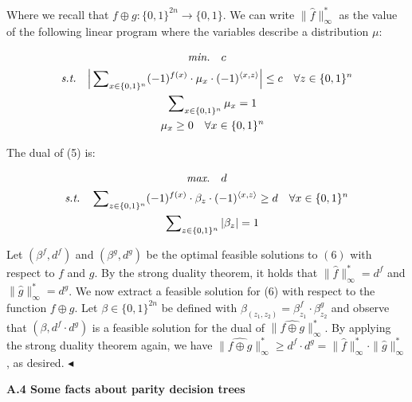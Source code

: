 Where we recall that $f\oplus g:\{0,1\}^{2n}\to\{0,1\}$. We can write $\|\widehat{f}\|_{\infty}^{*}$ as the value of the following linear program where the variables describe a distribution $\mu$:\par


\[\begin{gathered}
\emph{min.} \displaystyle\quad c \\
\emph{s.t.} \displaystyle\quad\Big{|}\sum\nolimits_{x\in\{0,1\}^{n}}(-1)^{f(x)}\cdot\mu_{x}\cdot(-1)^{\langle x,z\rangle}\Big{|}\leq c \displaystyle\quad\forall z\in\{0,1\}^{n} \\
\displaystyle\quad\sum\nolimits_{x\in\{0,1\}^{n}}\mu_{x}=1 \\
\displaystyle\quad\mu_{x}\geq 0 \displaystyle\quad\forall x\in\{0,1\}^{n}
\end{gathered}\]


The dual of (5) is:\par


\[\begin{gathered}
\emph{max.} \displaystyle\quad d \\
\emph{s.t.} \displaystyle\quad\sum\nolimits_{z\in\{0,1\}^{n}}(-1)^{f(x)}\cdot\beta_{z}\cdot(-1)^{\langle x,z\rangle}\geq d\quad\forall x\in\{0,1\}^{n} \\
\displaystyle\quad\sum\nolimits_{z\in\{0,1\}^{n}}|\beta_{z}|=1
\end{gathered}\]


Let $(\beta^{f},d^{f})$ and $(\beta^{g},d^{g})$ be the optimal feasible solutions to $(6)$ with respect to $f$ and $g$. By the strong duality theorem, it holds that $\|\widehat{f}\|_{\infty}^{*}=d^{f}$ and $\|\widehat{g}\|_{\infty}^{*}=d^{g}$. We now extract a feasible solution for (6) with respect to the function $f\oplus g$. Let $\beta\in\{0,1\}^{2n}$ be defined with $\beta_{(z_{1},z_{2})}=\beta^{f}_{z_{1}}\cdot\beta^{g}_{z_{2}}$ and observe that $(\beta,d^{f}\cdot d^{g})$ is a feasible solution for the dual of $\|\widehat{f\oplus g}\|_{\infty}^{*}$. By applying the strong duality theorem again, we have $\|\widehat{f\oplus g}\|_{\infty}^{*}\geq d^{f}\cdot d^{g}=\|\widehat{f}\|_{\infty}^{*}\cdot\|\widehat{g}\|_{\infty}^{*}$, as desired.
$\blacktriangleleft$\par






\par\medskip\noindent\textbf{
A.4 Some facts about parity decision trees}\par




